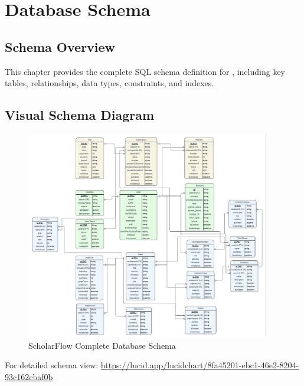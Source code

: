 \chapter{Database Schema}
\label{ch:database-schema}

\section{Schema Overview}
\label{sec:schema-overview}

This chapter provides the complete SQL schema definition for \projectname{}, including key tables, relationships, data types, constraints, and indexes.

\section{Visual Schema Diagram}
\label{sec:schema-diagram}

\begin{figure}[H]
\centering
\includegraphics[width=0.95\textwidth]{images/diagrams/schema.png}
\caption{ScholarFlow Complete Database Schema}
\label{fig:schema-complete}
\end{figure}

\noindent For detailed schema view: \url{https://lucid.app/lucidchart/8fa45201-ebc1-46e2-8204-93c162cbaf0b}

